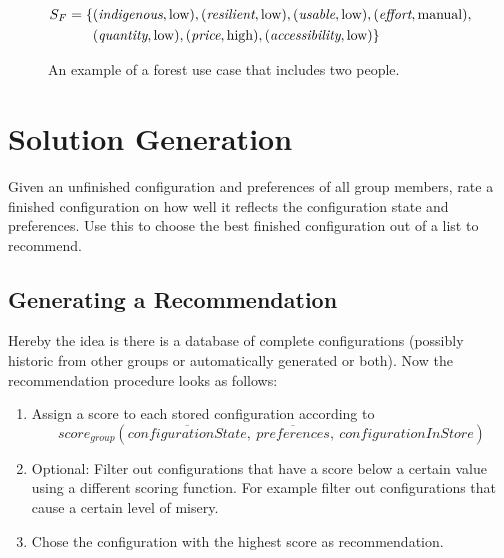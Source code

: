 \begin{figure}
\begin{mdframed}[frametitle={Example for Forest Use Case}]
\begin{align}
            \begin{split}
            S_F  =  \{ & (\textit{indigenous}, \text{low}), (\textit{resilient}, \text{low}), (\textit{usable},\text{low}), (\textit{effort}, \text{manual}), \\
            & (\textit{quantity}, \text{low}), (\textit{price},\text{high}),(\textit{accessibility}, \text{low}) \} 
            \end{split} \notag
        \end{align}
    \end{mdframed}
    \caption{An example of a forest use case that includes two people.}
    \label{fig:Concept:ForestExample}
\end{figure}


\section{Solution Generation}
\label{sec:Concept:SolutionGeneration}

Given an unfinished configuration and preferences of all group members, rate a finished configuration on how well it reflects the configuration state and preferences. Use this to choose the best finished configuration out of a list to recommend.

\subsection{Generating a Recommendation}

Hereby the idea is there is a database of complete configurations (possibly historic from other groups or automatically generated or both).
Now the recommendation procedure looks as follows:

\begin{enumerate}
    \item Assign a score to each stored configuration according to $$score_{group}(\overline{configurationState},\ \overline{preferences}, \ configurationInStore)$$
    \item Optional: Filter out configurations that have a score below a certain value using a different scoring function. For example filter out configurations that cause a certain level of misery.
    \item Chose the configuration with the highest score as recommendation.
\end{enumerate}




